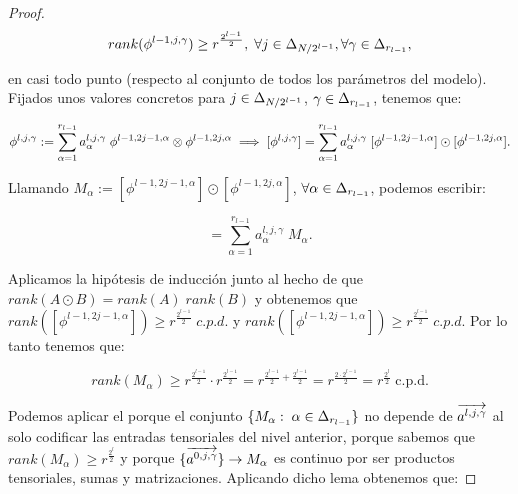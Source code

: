\begin{proof}
    \begin{equation}
        rank(\phi^{l-1, j, \gamma}) \geq r^{\frac{2^{l - 1}}{2}},
        \; \forall j \in \Delta_{N/2^{l-1}}, \forall \gamma \in \Delta_{r_{l-1}},
    \end{equation}

    en casi todo punto (respecto al conjunto de todos los parámetros del modelo). Fijados unos valores concretos para $j \in \Delta_{N/2^{l-1}}$, $\gamma \in \Delta_{r_{l-1}}$, tenemos que:

    \begin{equation}
        \phi^{l, j, \gamma} := \sum_{\alpha = 1}^{r_{l-1}} a_{\alpha}^{l, j, \gamma} \; \phi^{l-1, 2j-1, \alpha} \otimes \phi^{l-1, 2j, \alpha} \implies [\phi^{l, j, \gamma}] = \sum_{\alpha = 1}^{r_{l-1}} a_{\alpha}^{l, j, \gamma} \; [\phi^{l-1, 2j-1, \alpha}] \odot [\phi^{l-1, 2j, \alpha}].
    \end{equation}

    Llamando $M_\alpha := [\phi^{l-1, 2j-1, \alpha}] \odot [\phi^{l-1, 2j, \alpha}]$, $\forall \alpha \in \Delta_{r_{l-1}}$, podemos escribir:

    \begin{equation}
        [\phi^{l, j, \gamma}] = \sum_{\alpha = 1}^{r_{l-1}} a_{\alpha}^{l, j, \gamma} \; M_\alpha.
    \end{equation}

    Aplicamos la hipótesis de inducción junto al hecho de que $rank(A \odot B) = rank(A) \; rank(B)$ y obtenemos que $rank([\phi^{l-1, 2j-1, \alpha}]) \geq r^{\frac{2^{l-1}}{2}} \; c.p.d.$ y $rank([\phi^{l-1, 2j-1, \alpha}]) \geq r^{\frac{2^{l-1}}{2}} \; c.p.d.$ Por lo tanto tenemos que:

    \begin{equation}
        rank(M_\alpha) \geq r^{\frac{2^{l-1}}{2}} \cdot r^{\frac{2^{l-1}}{2}} = r^{\frac{2^{l-1}}{2} + \frac{2^{l-1}}{2}} =
        r^{\frac{2 \cdot 2^{l - 1}}{2}} = r^{\frac{2^{l}}{2}} \; \text{c.p.d.}
    \end{equation}

    Podemos aplicar el  porque el conjunto $\{ M_\alpha: \; \alpha \in \Delta_{r_{l-1}} \}$ no depende de $\overrightarrow{a^{l, j, \gamma}}$ al solo codificar las entradas tensoriales del nivel anterior, porque sabemos que $rank(M_\alpha) \geq r^{\frac{2^l}{2}}$ y porque $\{ \overrightarrow{a^{0, j, \gamma}} \} \to M_\alpha$ es continuo por ser productos tensoriales, sumas y matrizaciones. Aplicando dicho lema obtenemos que:


\end{proof}
